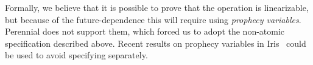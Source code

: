 Formally, we believe that it is possible to prove that the  
operation is linearizable, but because of the future-dependence this
will require using \emph{prophecy variables}.  Perennial
does not support them, which forced us to adopt the non-atomic
specification described above.  Recent results on prophecy variables
in Iris~\cite{jung:prophecy} could be used to avoid specifying
 separately.
